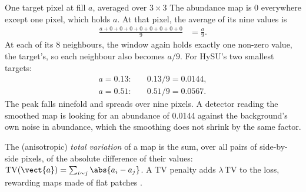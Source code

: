 \begin{worked}[label={we:hslunmix:avg}]{One target pixel at fill $a$, averaged over $3\times3$}
The abundance map is 0 everywhere except one pixel, which holds $a$. At that pixel, the average of its nine values is
\begin{align*}
\frac{a+0+0+0+0+0+0+0+0}{9} &= \frac{a}{9}.
\end{align*}
At each of its 8 neighbours, the window again holds exactly one non-zero value, the target's, so each neighbour also
becomes $a/9$. For HySU's two smallest targets\tagC:
\begin{align*}
a=0.13:&\quad 0.13/9 = 0.0144,\\
a=0.51:&\quad 0.51/9 = 0.0567 .
\end{align*}
The peak falls ninefold and spreads over nine pixels. A detector reading the smoothed map is looking for an abundance of
0.0144 against the background's own noise in abundance, which the smoothing does not shrink by the same factor.
\end{worked}

\begin{definition}
The (anisotropic) \emph{total variation} of a map is the sum, over all pairs of side-by-side pixels,
of the absolute difference of their values: $\mathrm{TV}(\vect{a})=\sum_{i\sim j}\abs{a_i-a_j}$. A TV penalty adds
$\lambda\,\mathrm{TV}$ to the loss, rewarding maps made of flat patches \citep{rudin1992tv}.
\end{definition}

